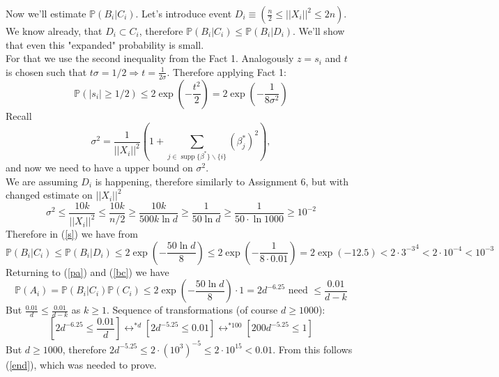 \documentclass[]{article}
\DeclareMathOperator\supp{supp}
\begin{document}
Now we'll estimate $\mathbb{P}\left(B_i\bigg\vert C_i\right)$. Let's introduce event $D_i\equiv \left(\frac{n}{2}\le ||X_i||^2\le 2n\right)$. We know already, that $D_i \subset C_i$, therefore $\mathbb{P}\left(B_i\bigg\vert C_i\right)
\le \mathbb{P}\left(B_i\bigg\vert D_i\right)$. We'll show that even this "expanded" probability is small.\\
For that we use the second inequality from the Fact 1. Analogously $z=s_i$ and $t$ is chosen such that $t\sigma = 1/2 \Rightarrow t = \frac{1}{2\sigma}$.
Therefore applying Fact 1:
\begin{equation}
\mathbb{P}(|s_i|\ge 1/2) \le 2\exp\left(-\frac{t^2}{2}\right)=2\exp\left(-\frac{1}{8\sigma^2}\right)
\label{s}
\end{equation}
Recall
$$\sigma^2= \frac{1}{||X_i||^2}\left(1+\sum_{j\in\supp\{\beta^*\}\backslash \{i\}}(\beta_j^*)^2\right)
,$$
and now we need to have a upper bound on $\sigma^2$.\\
We are assuming $D_i$ is happening, therefore similarly to Assignment 6, but with changed estimate on $||X_i||^2$
\begin{equation}
\sigma^2
\le \frac{10k}{||X_i||^2}
\le \frac{10k}{n/2}
\ge \frac{10k}{500k\ln{d}}
\ge \frac{1}{50\ln{d}}
\ge \frac{1}{50\cdot \ln{1000}}
\ge 10^{-2}
\end{equation}
Therefore in (\ref{s}) we have from
\begin{equation}
\mathbb{P}\left(B_i\bigg\vert C_i\right)\le
\mathbb{P}\left(B_i\bigg\vert D_i\right)\le
2\exp\left(-\frac{50\ln{d}}{8}\right)
\le 2\exp\left(-\frac{1}{8\cdot 0.01}\right)=2\exp\left(-12.5\right)<2\cdot {3^{-3}}^4<2\cdot 10^{-4}<10^{-3}
\end{equation}
Returning to (\ref{pa}) and (\ref{bc}) we have 
\begin{equation}
\mathbb{P}\left(A_i\right) 
= 
\mathbb{P}\left(B_i\bigg\vert C_i\right)\mathbb{P}\left(C_i\right)
\le
2\exp\left(-\frac{50\ln{d}}{8}\right)\cdot 1 = 2d^{-6.25}
\text{ need }\le \frac{0.01}{d-k}
\end{equation}
But $\frac{0.01}{d}\le\frac{0.01}{d-k}$ as $k\ge 1$.
Sequence of transformations (of course $d\ge 1000$):
\begin{equation}
\left[2d^{-6.25} \le \frac{0.01}{d}\right] 
\leftrightarrow^{*d}
\left[2d^{-5.25} \le 0.01\right]
\leftrightarrow^{*100}
\left[200d^{-5.25} \le 1\right]
\end{equation}
But $d\ge 1000$, therefore $2d^{-5.25}\le2\cdot ({10^3})^{-5}\le 2\cdot10^{15} < 0.01$.
From this follows (\ref{end}), which was needed to prove.
\end{document}
